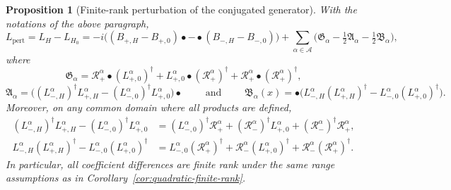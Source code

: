 \documentclass[11pt]{amsart}
\newcommand{\1}{\mathbbm{1}}
\theoremstyle{plain}
\newtheorem{proposition}[theorem]{Proposition}
\theoremstyle{definition}
\theoremstyle{remark}
\numberwithin{equation}{section}
\begin{document}
\begin{proposition}[Finite-rank perturbation of the conjugated generator]
\label{prop:conjugated-generator-perturbation}
  With the notations of the above paragraph,
\[
L_{\operatorname{pert}}=L_{H}-L_{H_0}=-i\big((B_{+,H}-B_{+,0})\bullet -\bullet (B_{-,H}-B_{-,0})\big)+\sum_{\alpha\in\mathcal A}\big(\mathfrak G_\alpha -\tfrac12\mathfrak A_\alpha -\tfrac12\mathfrak B_\alpha\big),
\]
where
\[
\mathfrak G_\alpha=\mathcal R_+^\alpha \bullet  (L_{+,0}^\alpha)^\dagger+L_{+,0}^\alpha \bullet (\mathcal R_+^\alpha)^\dagger+\mathcal R_+^\alpha \bullet  (\mathcal R_+^\alpha)^\dagger,
\]
\[
\mathfrak A_\alpha=\big((L_{-,H}^\alpha)^\dagger L_{+,H}^\alpha-(L_{-,0}^\alpha)^\dagger L_{+,0}^\alpha\big)\bullet \qquad \text{ and }\qquad
\mathfrak B_\alpha(x)=\bullet \big(L_{-,H}^\alpha (L_{+,H}^\alpha)^\dagger-L_{-,0}^\alpha (L_{+,0}^\alpha)^\dagger\big).
\]
Moreover, on any common domain where all products are defined,
\begin{equation}
    \begin{split}
    \label{eq:anti-comm_terms}
(L_{-,H}^\alpha)^\dagger L_{+,H}^\alpha-(L_{-,0}^\alpha)^\dagger L_{+,0}^\alpha&=(L_{-,0}^\alpha)^\dagger \mathcal R_+^\alpha+(\mathcal R_-^\alpha)^\dagger L_{+,0}^\alpha+(\mathcal R_-^\alpha)^\dagger \mathcal R_+^\alpha,\\
L_{-,H}^\alpha (L_{+,H}^\alpha)^\dagger-L_{-,0}^\alpha (L_{+,0}^\alpha)^\dagger&=L_{-,0}^\alpha (\mathcal R_+^\alpha)^\dagger+\mathcal R_-^\alpha (L_{+,0}^\alpha)^\dagger+\mathcal R_-^\alpha (\mathcal R_+^\alpha)^\dagger.
    \end{split}
\end{equation}
In particular, all coefficient differences are finite rank under the same range assumptions as in Corollary~\ref{cor:quadratic-finite-rank}.
\end{proposition}
\end{document}

